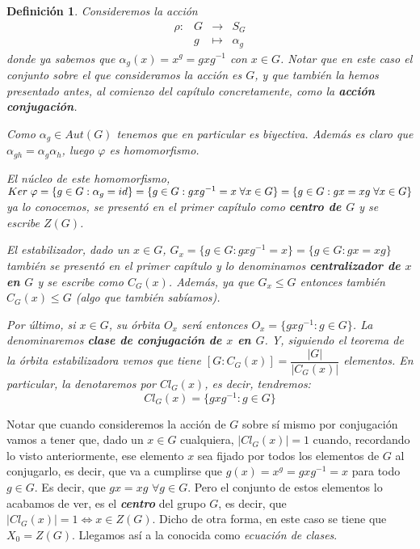 \documentclass[12pt]{article}
\newtheorem{definition}[theorem]{Definición}
\begin{document}
\begin{definition}\label{eq:accConj} Consideremos la acción $$\begin{array}{rccl}
\rho\colon &G& \longrightarrow &S_G\\
&g& \longmapsto &\alpha_{g}
\end{array}
$$
donde ya sabemos que $\alpha_{g}(x) = x^{g}=gxg^{-1}$ con $x \in G$. Notar que en este caso el conjunto sobre el que consideramos la acción es $G$, y que también la hemos presentado antes, al comienzo del capítulo concretamente, como la \textbf{acción conjugación}.

Como $\alpha_{g} \in Aut(G)$ tenemos que en particular es biyectiva. Además es claro que $\alpha_{gh}=\alpha_{g}\alpha_{h}$, luego $\varphi$ es homomorfismo.

El núcleo de este homomorfismo, $Ker \hspace{0.1cm} \varphi = \lbrace g \in G: \alpha_{g} = id \rbrace = \lbrace g \in G: gxg^{-1} = x \hspace{0.1cm} \forall x \in G \rbrace =  \lbrace g \in G: gx = xg \hspace{0.1cm} \forall x \in G \rbrace$ ya lo conocemos, se presentó en el primer capítulo como \textbf{centro de $G$} y se escribe \textbf{$Z(G)$}.

El estabilizador, dado un $x \in G$, $G_{x}= \lbrace g \in G: gxg^{-1} = x \rbrace = \lbrace g \in G: gx=xg \rbrace$ también se presentó en el primer capítulo y lo denominamos \textbf{centralizador de $x$ en $G$} y se escribe como \textbf{$C_{G}(x)$}. Además, ya que $G_{x} \leq G$ entonces también $C_{G}(x) \leq G$ (algo que también sabíamos).

Por último, si $x \in G$, su órbita $O_{x}$ será entonces $O_{x} = \lbrace gxg^{-1}:g \in G \rbrace$. La denominaremos \textbf{clase de conjugación de $x$ en $G$}. Y, siguiendo el teorema de la órbita estabilizadora vemos que tiene $[G:C_{G}(x)] = \dfrac{|G|}{|C_{G}(x)|}$ elementos. En particular, la denotaremos por $Cl_{G}(x)$, es decir, tendremos: $$Cl_{G}(x) = \lbrace gxg^{-1} : g \in G \rbrace$$
\end{definition}

Notar que cuando consideremos la acción de $G$ sobre sí mismo por conjugación vamos a tener que, dado un $x \in G$ cualquiera, $|Cl_{G}(x)| = 1$ cuando, recordando lo visto anteriormente, ese elemento $x$ sea fijado por todos los elementos de $G$ al conjugarlo, es decir, que va a cumplirse que $g(x) = x^{g} = gxg^{-1} = x$ para todo $g \in G$. Es decir, que $gx = xg$ $\forall g \in G$. Pero el conjunto de estos elementos lo acabamos de ver, es el \textbf{\textit{centro}} del grupo $G$, es decir, que $|Cl_{G}(x)| = 1 \Leftrightarrow x \in Z(G)$. Dicho de otra forma, en este caso se tiene que $X_{0}= Z(G)$. Llegamos así a la conocida como \textit{ecuación de clases}.
\end{document}
